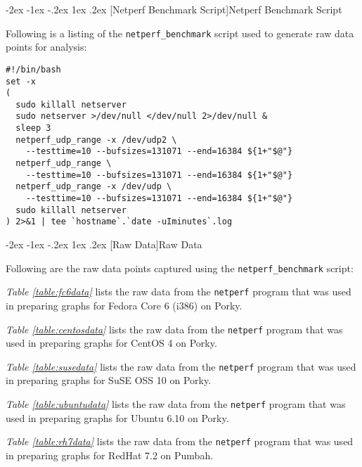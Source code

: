 \documentclass[letterpaper,final,notitlepage,twocolumn,10pt,twoside]{article}
\makeatletter
\renewcommand\section{\@startsection {section}{1}{\z@}%
                                   {-2ex \@plus -1ex \@minus -.2ex}%
                                   {1ex \@plus .2ex}%
                                   {\normalfont\large\bfseries}}
\makeatother
\begin{document}
\clearpage
\begin{appendix}

\section[Netperf Benchmark Script]{Netperf Benchmark Script}
\label{section:script}

Following is a listing of the \texttt{netperf\_benchmark} script used to generate raw data points
for analysis:

\footnotesize
\begin{verbatim}
#!/bin/bash
set -x
(
  sudo killall netserver
  sudo netserver >/dev/null </dev/null 2>/dev/null &
  sleep 3
  netperf_udp_range -x /dev/udp2 \
    --testtime=10 --bufsizes=131071 --end=16384 ${1+"$@"}
  netperf_udp_range \
    --testtime=10 --bufsizes=131071 --end=16384 ${1+"$@"}
  netperf_udp_range -x /dev/udp \
    --testtime=10 --bufsizes=131071 --end=16384 ${1+"$@"}
  sudo killall netserver
) 2>&1 | tee `hostname`.`date -uIminutes`.log
\end{verbatim}
\normalsize

\section[Raw Data]{Raw Data}
\label{section:rawdata}

Following are the raw data points captured using the \texttt{netperf\_benchmark} script:

\textit{Table \ref{table:fc6data}} lists the raw data from the \texttt{netperf} program that was
used in preparing graphs for Fedora Core 6 (i386) on Porky.

\textit{Table \ref{table:centosdata}} lists the raw data from the \texttt{netperf} program that was
used in preparing graphs for CentOS 4 on Porky.

\textit{Table \ref{table:susedata}} lists the raw data from the \texttt{netperf} program that was
used in preparing graphs for SuSE OSS 10 on Porky.

\textit{Table \ref{table:ubuntudata}} lists the raw data from the \texttt{netperf} program that was
used in preparing graphs for Ubuntu 6.10 on Porky.


\textit{Table \ref{table:rh7data}} lists the raw data from the \texttt{netperf} program that was
used in preparing graphs for RedHat 7.2 on Pumbah.


\end{appendix}
\end{document}
